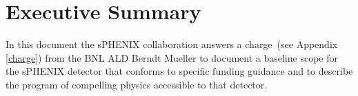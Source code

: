 \chapter*{Executive Summary}
\label{executive_summary}
\setcounter{page}{1}

In this document the sPHENIX collaboration answers a charge~(see
Appendix \ref{charge}) from the BNL ALD Berndt Mueller to document a
baseline scope for the sPHENIX detector that conforms to specific
funding guidance and to describe the program of compelling physics
accessible to that detector.

\nocite{*}

